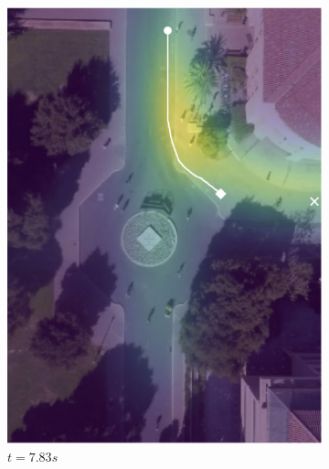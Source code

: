 \documentclass[letterpaper,10pt,conference]{ieeeconf}
\begin{document}
\begin{figure}
	\begin{subfigure}[b]{.45\linewidth}
		\includegraphics[width=\linewidth]{./figures/FirstPage/gates_1_2_t=235.jpg}
		\caption{$t=7.83s$}
	\end{subfigure}
	\begin{subfigure}[b]{.45\linewidth}

\end{subfigure}
\end{figure}
\end{document}
